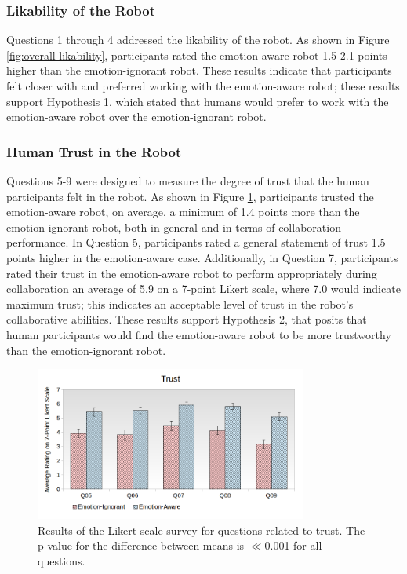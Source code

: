 \documentclass[12pt]{report}
\begin{document}
\subsubsection{Likability of the Robot}
\label{sec:Likability}
Questions 1 through 4 addressed the likability of the robot. As shown in Figure
\ref{fig:overall-likability}, participants rated the emotion-aware robot
1.5-2.1 points higher than the emotion-ignorant robot. These results
indicate that participants felt closer with and preferred working with the
emotion-aware robot; these results support Hypothesis 1, which stated that
humans would prefer to work with the emotion-aware robot over the
emotion-ignorant robot.

\subsubsection{Human Trust in the Robot}
\label{sec:Trust}
Questions 5-9 were designed to measure the degree of trust that the human
participants felt in the robot. As shown in Figure \ref{fig:overall-trust},
participants trusted the emotion-aware robot, on average, a minimum of 1.4
points more than the emotion-ignorant robot, both in general and in terms of
collaboration performance. In Question 5, participants rated a
general statement of trust 1.5 points higher in the emotion-aware
case. Additionally, in Question 7, participants rated their trust in the
emotion-aware robot to perform appropriately during collaboration an average of
5.9 on a 7-point Likert scale, where 7.0 would indicate maximum trust; this
indicates an acceptable level of trust in the robot's collaborative
abilities. These results support Hypothesis 2, that posits that human
participants would find the emotion-aware robot to be more trustworthy than the
emotion-ignorant robot.

\vspace*{-5mm}
\begin{figure}[tbh]
\centering
\includegraphics[width=0.8\textwidth]{figure/Overall-Trust.png}
\vspace*{-5mm}
\caption{\fontsize{10}{10}\selectfont Results of the Likert scale survey for
questions related to trust. The p-value for the difference between means is
$\ll$0.001 for all questions.}
\label{fig:overall-trust}
\vspace*{-5mm}
\end{figure}
\end{document}
